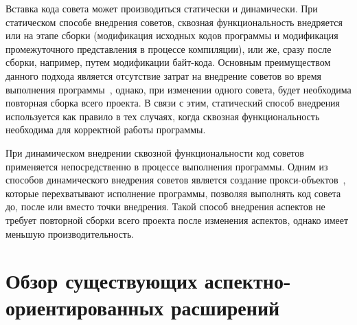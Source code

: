 \documentclass[conference]{IEEEtran}
\begin{document}

Вставка кода совета может производиться статически и динамически.
При статическом способе внедрения советов, сквозная функциональность внедряется
или на этапе сборки (модификация исходных кодов программы и модификация
промежуточного представления в процессе компиляции), или же, сразу после сборки, 
например, путем модификации байт-кода.
Основным преимуществом данного подхода является отсутствие затрат на внедрение
советов во время выполнения программы~\cite{static_and_dynamic_weaving}, однако,
при изменении одного совета, будет необходима повторная сборка всего проекта.
В связи с этим, статический способ внедрения используется как правило в тех
случаях, когда сквозная функциональность необходима для корректной работы
программы.

При динамическом внедрении сквозной функциональности код советов применяется
непосредственно в процессе выполнения программы.
Одним из способов динамического внедрения советов является создание 
прокси-объектов~\cite{aspect_dynamic_weavers}, которые перехватывают
исполнение программы, позволяя выполнять код совета до, после или вместо точки
внедрения.
Такой способ внедрения аспектов не требует повторной сборки всего проекта после
изменения аспектов, однако имеет меньшую производительность.

\section{Обзор существующих аспектно-ориентированных расширений}
\end{document}
